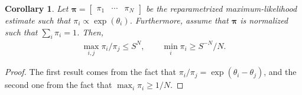 \documentclass[12pt,a4paper,oneside]{article}
\theoremstyle{plain}
\newtheorem{corollary}{Corollary}
\begin{document}
\begin{corollary}
Let $\bm{\pi} = \begin{bmatrix} \pi_1 & \cdots & \pi_N \end{bmatrix}$ be the reparametrized maximum-likelihood estimate such that $\pi_i \propto \exp(\theta_i)$.
Furthermore, assume that $\bm{\pi}$ is normalized such that $\sum_i \pi_i = 1$.
Then,
\begin{align*}
\max_{i, j} \pi_i / \pi_j \le S^N,
\qquad \min_i \pi_i \ge S^{-N} / N.
\end{align*}
\end{corollary}
\begin{proof}
The first result comes from the fact that $\pi_i / \pi_j = \exp(\theta_i - \theta_j)$, and the second one from the fact that $\max_i \pi_i \ge 1/N$.
\end{proof}
\end{document}
